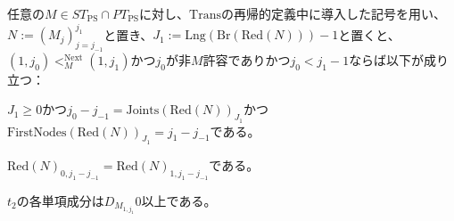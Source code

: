 \documentclass[dvipdfmx,uplatex]{jsarticle}
\theoremstyle{customnonumberbreakfortheorem}
\theoremstyle{customnonumberbreakforproof}
\begin{document}
\begin{lemma}\label{条件(V)の下でのJointsとFirstNodesとt_2との基本性質}
	任意の\(M \in ST_{\textrm{PS}} \cap PT_{\textrm{PS}}\)に対し、\(\textrm{Trans}\)の再帰的定義中に導入した記号を用い、\(N := (M_j)_{j=j_{-1}}^{j_1}\)と置き、\(J_1 := \textrm{Lng}(\textrm{Br}(\textrm{Red}(N)))-1\)と置くと、\((1,j_0) <_M^{\textrm{Next}} (1,j_1)\)かつ\(j_0\)が非\(M\)許容でありかつ\(j_0 < j_1-1\)ならば以下が成り立つ：
	\begin{penumerate}
		\item \(J_1 \geq 0\)かつ\(j_0-j_{-1} = \textrm{Joints}(\textrm{Red}(N))_{J_1}\)かつ\(\textrm{FirstNodes}(\textrm{Red}(N))_{J_1} = j_1-j_{-1}\)である。
		\item \(\textrm{Red}(N)_{0,j_1-j_{-1}} = \textrm{Red}(N)_{1,j_1-j_{-1}}\)である。
		\item \(t_2\)の各単項成分は\(D_{M_{1,j_1}} 0\)以上である。
	\end{penumerate}
\end{lemma}
\end{document}
